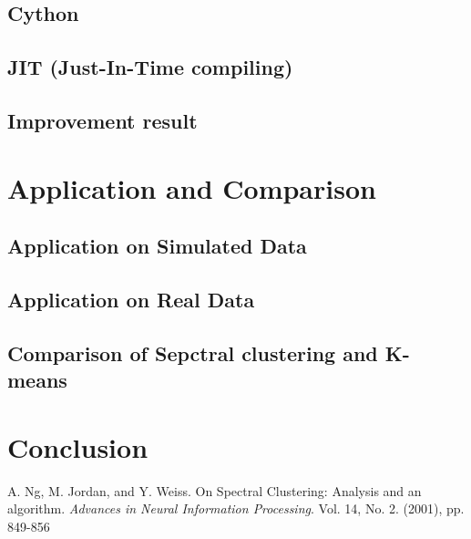 \documentclass[11pt]{article}
\begin{document}
\subsection{Cython}
\subsection{JIT (Just-In-Time compiling) }

\subsection{Improvement result}


\section{Application and Comparison}
\subsection{Application on Simulated Data}

\subsection{Application on Real Data}
\subsection{Comparison of Sepctral clustering and K-means}



\section{Conclusion}

%
%


\newpage
\begin{thebibliography}{9}



A. Ng, M. Jordan, and Y. Weiss.
On Spectral Clustering: Analysis and an algorithm.
\textit{Advances in Neural Information Processing}.
Vol. 14, No. 2. (2001), pp. 849-856 

\end{thebibliography}
\end{document}
